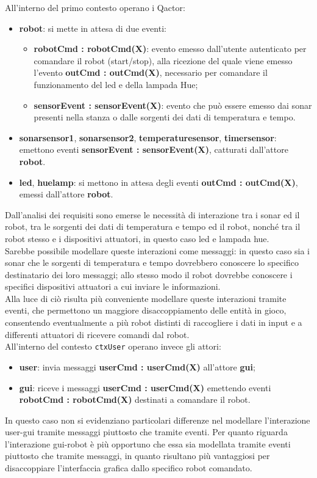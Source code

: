 \documentclass{llncs}
\newcommand{\action}[1]{\texttt{#1}\xspace}
\begin{document}
All'interno del primo contesto operano i Qactor:
\begin{itemize}
	\item \textbf{robot}: si mette in attesa di due eventi: 
	\begin{itemize}
		\item \textbf{robotCmd : robotCmd(X)}: evento emesso dall'utente autenticato per comandare il robot (start/stop), alla ricezione del quale viene emesso l'evento \textbf{outCmd : outCmd(X)}, necessario per comandare il funzionamento del led e della lampada Hue;
		\item \textbf{sensorEvent : sensorEvent(X)}: evento che può essere emesso dai sonar presenti nella stanza o dalle sorgenti dei dati di temperatura e tempo.
	\end{itemize}
	 \item \textbf{sonarsensor1}, \textbf{sonarsensor2}, \textbf{temperaturesensor}, \textbf{timersensor}: emettono eventi \textbf{sensorEvent : sensorEvent(X)}, catturati dall'attore \textbf{robot}.
	 \item \textbf{led}, \textbf{huelamp}: si mettono in attesa 
	 degli eventi \textbf{outCmd : outCmd(X)}, emessi dall'attore \textbf{robot}. 
\end{itemize}
Dall'analisi dei requisiti sono emerse le necessità di interazione tra i sonar ed il robot, tra le sorgenti dei dati di temperatura e tempo ed il robot, nonché tra il robot stesso e i dispositivi attuatori, in questo caso led e lampada hue. \\
Sarebbe possibile modellare queste interazioni come messaggi: in questo caso sia i sonar che le sorgenti di temperatura e tempo dovrebbero conoscere lo specifico destinatario dei loro messaggi; allo stesso modo il robot dovrebbe conoscere i specifici dispositivi attuatori a cui inviare le informazioni. \\
Alla luce di ciò risulta più conveniente modellare queste interazioni tramite eventi, che permettono un maggiore disaccoppiamento delle entità in gioco, consentendo eventualmente a più robot distinti di raccogliere i dati in input e a differenti attuatori di ricevere comandi dal robot. \\

All'interno del contesto \action{ctxUser} operano invece gli attori:
\begin{itemize}
	\item \textbf{user}: invia messaggi \textbf{userCmd : userCmd(X)} all'attore \textbf{gui};
	\item \textbf{gui}: riceve i messaggi \textbf{userCmd : userCmd(X)} emettendo eventi \textbf{robotCmd : robotCmd(X)} destinati a comandare il robot.
\end{itemize}
In questo caso non si evidenziano particolari differenze nel modellare l'interazione user-gui tramite messaggi piuttosto che tramite eventi. 
Per quanto riguarda l'interazione gui-robot è più opportuno che essa sia modellata tramite eventi piuttosto che tramite messaggi, in quanto risultano più vantaggiosi per disaccoppiare l'interfaccia grafica dallo specifico robot comandato. 
\end{document}
